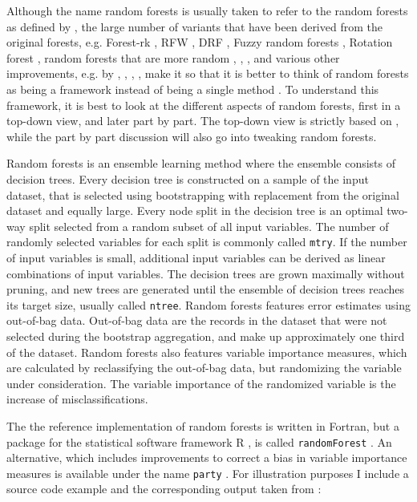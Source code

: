 \documentclass[a4paper,man,12pt,apacite]{apa6} %
\begin{document}
Although the name random forests is usually taken to refer to the random
forests as defined by \cite{breiman2001random}, the large number of
variants that have been derived from the original forests, e.g.
Forest-rk \cite{bernard2008forest}, RFW \cite{maudes2012random},
DRF \cite{bernard2012dynamic}, Fuzzy random forests \cite{bonissone2008fuzzy},
Rotation forest \cite{rodriguez2006rotation}, random forests that are
more random \cite{geurts2006extremely}, \cite{liu2005maximizing},
\cite{cutler2001pert}, and various other improvements, e.g. by
\cite{banfield2007comparison}, \cite{robnik2004improving},
\cite{strobl2009introduction}, \cite{zhang2012bias}, make it so that it
is better to think of random forests as being a framework instead of being
a single method \cite{wpRF}.
To understand this framework, it is best to look at the different aspects
of random forests, first in a top-down view, and later part by part.
The top-down view is strictly based on \cite{breiman2001random},
while the part by part discussion will also go into tweaking random forests.

Random forests is an ensemble learning method where the ensemble consists
of decision trees.
Every decision tree is constructed on a sample of the input dataset,
that is selected using bootstrapping with replacement from the original
dataset and equally large.
Every node split in the decision tree is an optimal two-way split selected
from a random subset of all input variables.
The number of randomly selected variables for each split is commonly called
\texttt{mtry}.
If the number of input variables is small, additional input variables can be
derived as linear combinations of input variables.
The decision trees are grown maximally without pruning,
and new trees are generated until the ensemble of decision trees reaches its
target size, usually called \texttt{ntree}.
Random forests features error estimates using out-of-bag data.
Out-of-bag data are the records in the dataset that were not selected during
the bootstrap aggregation, and make up approximately one third of the dataset.
Random forests also features variable importance measures,
which are calculated by reclassifying the out-of-bag data,
but randomizing the variable under consideration.
The variable importance of the randomized variable is the increase of
misclassifications.

The the reference implementation of random forests is written in Fortran,
but a package for the statistical software framework R \cite{rproject2012},
is called \texttt{randomForest} \cite{liaw2002classification}.
An alternative, which includes improvements to correct a bias in variable
importance measures is available under the name \texttt{party}
\cite{strobl2008conditional}.
For illustration purposes I include a source code example and the
corresponding output taken from \cite{strobl2008conditional}:
\end{document}
